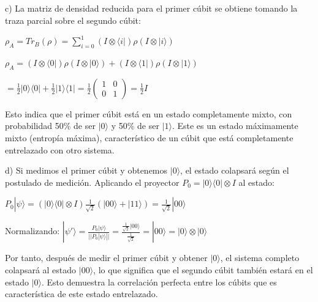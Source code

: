 \begin{questions}
\begin{solution}
    c) La matriz de densidad reducida para el primer cúbit se obtiene tomando la traza parcial sobre el segundo cúbit:

    $\rho_A = Tr_B(\rho) = \sum_{i=0}^1 (I \otimes \langle i|)\rho(I \otimes |i\rangle)$

    $\rho_A = (I \otimes \langle 0|)\rho(I \otimes |0\rangle) + (I \otimes \langle 1|)\rho(I \otimes |1\rangle)$

    $= \frac{1}{2}|0\rangle\langle0| + \frac{1}{2}|1\rangle\langle1| = \frac{1}{2}\begin{pmatrix} 1 & 0 \\ 0 & 1 \end{pmatrix} = \frac{1}{2}I$

    Esto indica que el primer cúbit está en un estado completamente mixto, con probabilidad 50\% de ser $|0\rangle$ y 50\% de ser $|1\rangle$. Este es un estado máximamente mixto (entropía máxima), característico de un cúbit que está completamente entrelazado con otro sistema.

    d) Si medimos el primer cúbit y obtenemos $|0\rangle$, el estado colapsará según el postulado de medición. Aplicando el proyector $P_0 = |0\rangle\langle0| \otimes I$ al estado:

    $P_0|\psi\rangle = (|0\rangle\langle0| \otimes I)\frac{1}{\sqrt{2}}(|00\rangle + |11\rangle) = \frac{1}{\sqrt{2}}|00\rangle$

    Normalizando:
    $|\psi'\rangle = \frac{P_0|\psi\rangle}{||P_0|\psi\rangle||} = \frac{\frac{1}{\sqrt{2}}|00\rangle}{\frac{1}{\sqrt{2}}} = |00\rangle = |0\rangle \otimes |0\rangle$

    Por tanto, después de medir el primer cúbit y obtener $|0\rangle$, el sistema completo colapsará al estado $|00\rangle$, lo que significa que el segundo cúbit también estará en el estado $|0\rangle$. Esto demuestra la correlación perfecta entre los cúbits que es característica de este estado entrelazado.
  \end{solution}
\end{questions}